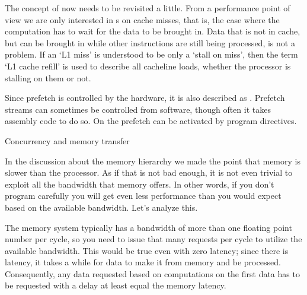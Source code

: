 The concept of  now needs to be revisited a
little. From a performance point of view we are only interested in
s on cache misses, that is, the case where the
computation has to wait for the data to be brought in. Data that is
not in cache, but can be brought in while other instructions are still
being processed, is not a problem. If an `L1 miss' is understood to be
only a `stall on miss', then the term `L1 cache refill' is used to
describe all cacheline loads, whether the processor is stalling on
them or not.

Since prefetch is controlled by the hardware, it is also described as
.  Prefetch streams can sometimes be
controlled from software, though often it takes assembly code
to do so. On the  prefetch can be
activated by program directives.

 {Concurrency and memory transfer}

In the discussion about the memory hierarchy we made the point that
memory is slower than the processor. As if that is not bad enough, it
is not even trivial to exploit all the bandwidth that memory
offers. In other words, if you don't program carefully you will get
even less performance than you would expect based on the available
bandwidth. Let's analyze this.

The memory system typically has a bandwidth of more than one floating
point number per cycle, so you need to issue that many requests per
cycle to utilize the available bandwidth. This would be true even with
zero latency; since there is latency, it takes a while for data to
make it from memory and be processed. Consequently, any data requested
based on computations on the first data has to be requested with a
delay at least equal the memory latency.

